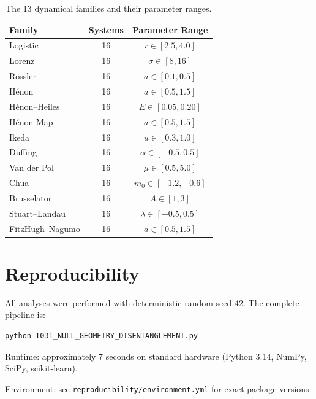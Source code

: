 \documentclass[10pt]{article}
\begin{document}
\begin{table}[h]
\centering
\caption{The 13 dynamical families and their parameter ranges.}
\begin{tabular}{lcc}
\toprule
Family & Systems & Parameter Range \\
\midrule
Logistic & 16 & $r \in [2.5, 4.0]$ \\
Lorenz & 16 & $\sigma \in [8, 16]$ \\
R\"ossler & 16 & $a \in [0.1, 0.5]$ \\
H\'enon & 16 & $a \in [0.5, 1.5]$ \\
H\'enon--Heiles & 16 & $E \in [0.05, 0.20]$ \\
H\'enon Map & 16 & $a \in [0.5, 1.5]$ \\
Ikeda & 16 & $u \in [0.3, 1.0]$ \\
Duffing & 16 & $\alpha \in [-0.5, 0.5]$ \\
Van der Pol & 16 & $\mu \in [0.5, 5.0]$ \\
Chua & 16 & $m_0 \in [-1.2, -0.6]$ \\
Brusselator & 16 & $A \in [1, 3]$ \\
Stuart--Landau & 16 & $\lambda \in [-0.5, 0.5]$ \\
FitzHugh--Nagumo & 16 & $a \in [0.5, 1.5]$ \\
\bottomrule
\end{tabular}
\end{table}

\section{Reproducibility}
\label{sec:reproducibility}

All analyses were performed with deterministic random seed 42. The complete pipeline is:

\begin{verbatim}
python T031_NULL_GEOMETRY_DISENTANGLEMENT.py
\end{verbatim}

Runtime: approximately 7 seconds on standard hardware (Python 3.14, NumPy, SciPy, scikit-learn).

Environment: see \texttt{reproducibility/environment.yml} for exact package versions.
\end{document}

